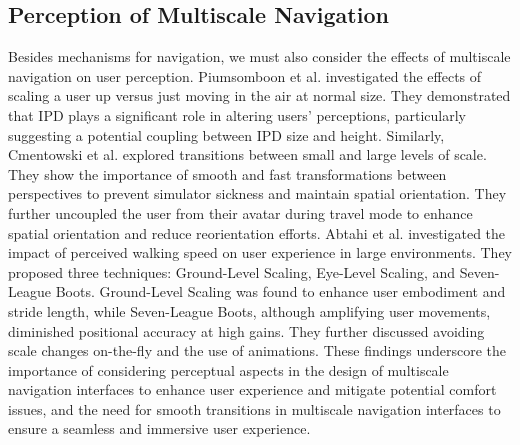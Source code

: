 \subsection{Perception of Multiscale Navigation}
Besides mechanisms for navigation, we must also consider the effects of multiscale navigation on user perception. Piumsomboon et al. \cite{piumsomboon_superman_2018} investigated the effects of scaling a user up versus just moving in the air at normal size. They demonstrated that IPD plays a significant role in altering users' perceptions, particularly suggesting a potential coupling between IPD size and height. Similarly, Cmentowski et al. \cite{cmentowski_outstanding_2019} explored transitions between small and large levels of scale. They show the importance of smooth and fast transformations between perspectives to prevent simulator sickness and maintain spatial orientation. They further uncoupled the user from their avatar during travel mode to enhance spatial orientation and reduce reorientation efforts. Abtahi et al.  \cite{abtahi_im_2019} investigated the impact of perceived walking speed on user experience in large environments. They proposed three techniques: Ground-Level  Scaling, Eye-Level Scaling, and Seven-League Boots. Ground-Level Scaling was found to enhance user embodiment and stride length, while Seven-League Boots, although amplifying user movements, diminished positional accuracy at high gains. They further discussed avoiding scale changes on-the-fly and the use of animations. These findings underscore the importance of considering perceptual aspects in the design of multiscale navigation interfaces to enhance user experience and mitigate potential comfort issues, and the need for smooth transitions in multiscale navigation interfaces to ensure a seamless and immersive user experience.